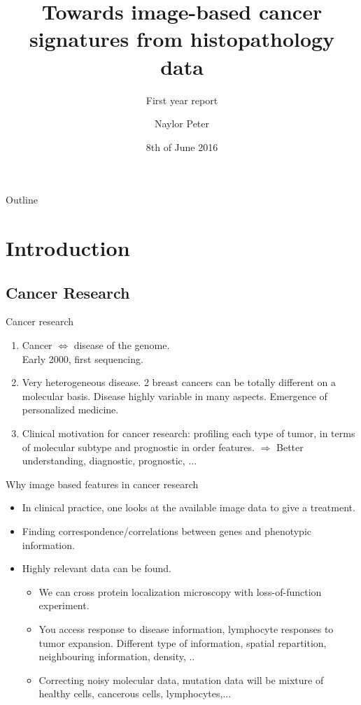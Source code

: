 \documentclass{beamer}
\title{Towards image-based cancer signatures from histopathology data}
\subtitle{First year report}
\author{Naylor Peter}
\date{8th of June 2016}
\begin{document}
\begin{frame}
  \titlepage
\end{frame}

\begin{frame}{Outline}
  \tableofcontents
\end{frame}

\section{Introduction}
\subsection{Cancer Research}
\begin{frame}{Cancer research}
\begin{enumerate}
\item Cancer $\Longleftrightarrow$ disease of the genome. \\ 
Early 2000, first sequencing.
\item Very heterogeneous disease. 2 breast cancers can be totally different on a molecular basis. Disease highly variable in many aspects. Emergence of personalized medicine. 
\item Clinical motivation for cancer research: profiling each type of tumor, in terms of molecular subtype and prognostic in order features. $\Longrightarrow$ Better understanding, diagnostic, prognostic, ...
\end{enumerate}
\end{frame}

\begin{frame}{Why image based features in cancer research}
\begin{itemize}
\item In clinical practice, one looks at the available image data to give a treatment. 
\item Finding correspondence/correlations between genes and phenotypic information. 
\item Highly relevant data can be found. \\
\begin{itemize}
\item We can cross protein localization microscopy with loss-of-function experiment.
\item You access response to disease information, lymphocyte responses to tumor expansion. Different type of information, spatial repartition, neighbouring information, density, ..
\item Correcting noisy molecular data, mutation data will be mixture of healthy cells, cancerous cells, lymphocytes,...
\end{itemize}
\end{itemize}
\end{frame}
\end{document}

